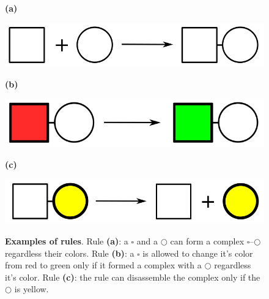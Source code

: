 \documentclass[12pt]{fithesis2}
\begin{document}
\begin{figure}[!h]
\begin{center}
\begin{minipage}[l]{0.1\textwidth}
    \textbf{(a)}
  \end{minipage}
  \begin{minipage}[r]{0.6\textwidth}
    {\hspace*{0.8cm}\includegraphics[scale=0.2]{pics/rule_complex}}
\end{minipage}

\begin{minipage}[l]{0.1\textwidth}
    \textbf{(b)}
  \end{minipage}
  \begin{minipage}[r]{0.6\textwidth}
    {\hspace*{1.35cm}\includegraphics[scale=0.2]{pics/rule_change}}
\end{minipage}

\begin{minipage}[l]{0.1\textwidth}
    \textbf{(c)}
  \end{minipage}
  \begin{minipage}[r]{0.6\textwidth}
    {\hspace*{1.3cm}\includegraphics[scale=0.2]{pics/rule_diss}}
\end{minipage}
\caption{\textbf{Examples of rules}. Rule \textbf{(a)}: a $\square$ and a $\bigcirc$ can form a complex $\square$--$\bigcirc$ regardless their colors. Rule \textbf{(b)}: a $\square$ is allowed to change it's color from red to green only if it formed a complex with a $\bigcirc$ regardless it's color. Rule \textbf{(c)}: the rule can disassemble the complex only if the $\bigcirc$ is yellow.}
\label{rules:fig}
\end{center}
\end{figure}
\end{document}
